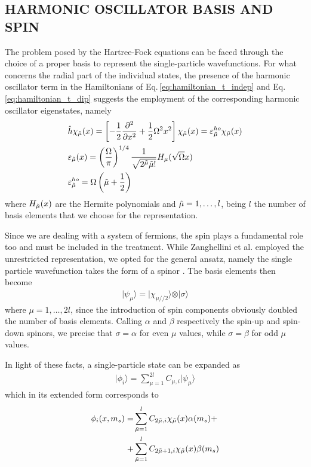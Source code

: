 \subsection{HARMONIC OSCILLATOR BASIS AND SPIN}
The problem posed by the Hartree-Fock equations can be faced through the choice of a proper basis to represent the single-particle wavefunctions. For what concerns the radial part of the individual states, the presence of the harmonic oscillator term in the Hamiltonians of Eq.\,\ref{eq:hamiltonian_t_indep} and Eq.\,\ref{eq:hamiltonian_t_dip} suggests the employment of the corresponding harmonic oscillator eigenstates, namely
\begin{align*}
    &\hat{h} \chi_{\Tilde{\mu}} (x) = \left[ -\frac{1}{2} \frac{\partial^2}{\partial x^2} + \frac{1}{2} \Omega^2 x^2 \right] \chi_{\Tilde{\mu}}(x) = \varepsilon_{\Tilde{\mu}}^{ho} \chi_{\Tilde{\mu}}(x) \\
    &\varepsilon_{\Tilde{\mu}} (x) = \left( \frac{\Omega}{\pi} \right)^{1/4} \frac{1}{\sqrt{2^{{\Tilde{\mu}}}  {\Tilde{\mu}}!}} H_\mu(\sqrt{\Omega}x) \\
    &\varepsilon_{\Tilde{\mu}}^{ho} = \Omega \left( {\Tilde{\mu}} + \frac{1}{2} \right)
\end{align*}
where $H_{\Tilde{\mu}}(x)$ are the Hermite polynomials and ${\Tilde{\mu}}=1,\dots,l$, being $l$ the number of basis elements that we choose for the representation. 

Since we are dealing with a system of fermions, the spin plays a fundamental role too and must be included in the treatment. While Zanghellini et al. employed the unrestricted representation, we opted for the general ansatz, namely the single particle wavefunction takes the form of a spinor \cite{state_of_art}. The basis elements then become
\begin{align*}
    \vert \psi_\mu \rangle = \vert \chi_{\mu//2} \rangle \otimes \vert \sigma \rangle
\end{align*}
where $\mu=1,\dots,2l$, since the introduction of spin components obviously doubled the number of basis elements. Calling $\alpha$ and $\beta$ respectively the spin-up and spin-down spinors, we precise that $\sigma=\alpha$ for even $\mu$ values, while $\sigma=\beta$ for odd $\mu$ values.

In light of these facts, a single-particle state can be expanded as
\begin{align*}
    \vert \phi_i \rangle = \sum_{\mu=1}^{2l} C_{\mu,i} \vert \psi_\mu \rangle
\end{align*}
which in its extended form corresponds to 
\begin{align}
\begin{split}
    \phi_i(x,m_s) =& \sum_{\Tilde{\mu}=1}^l C_{2\Tilde{\mu},i} \chi_{\Tilde{\mu}}(x) \alpha(m_s) + \\
    +& \sum_{\Tilde{\mu}=1}^l C_{2\Tilde{\mu}+1,i} \chi_{\Tilde{\mu}}(x) \beta(m_s)
\end{split}
\label{eq:expansion_spf_gen}
\end{align}


